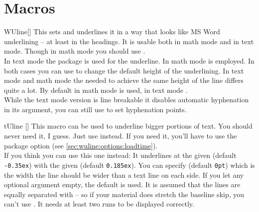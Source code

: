 \section{Macros}\label{sec:wuline:mac}%
\begin{describemacro}{WUline}[]%
  This sets  and underlines it in a way that looks like MS Word
  underlining -- at least in the headings. It is usable both in math mode and in
  text mode. Though in math mode you should use .\\[\parskip]
  In text mode the  package is used for the underline. In math mode
   is employed. In both cases you can use  to
  change the default height of the underlining. In text mode and math mode the
  needed  to achieve the same height of the line differs quite a
  lot. By default in math mode \texttt{} is
  used, in text mode \texttt{}.\\[\parskip]
  While the text mode version is line breakable it disables automatic
  hyphenation in its argument, you can still use \cs{-} to set hyphenation
  points.
\end{describemacro}%
\begin{describemacro}{tUline}%
  []
  This macro can be used to underline bigger portions of text. You should never
  need it, I guess. Just use  instead. If you need it, you'll have to
  use the package option  (see
  \autoref{sec:wuline:options:loadtime}).\\[\parskip]
  If you think you can use this one instead: It underlines  at the
  given  (default \texttt{-0.35ex}) with the given 
  (default \texttt{0.185ex}). You can specify  (default
  \texttt{0pt}) which is the width the line should be wider than a text line on
  each side. If you let any optional argument empty, the default is used. It is
  assumed that the lines are equally separated with  -- so if
  your material does stretch the baseline skip, you can't use . It
  needs at least two runs to be displayed correctly.
\end{describemacro}%

